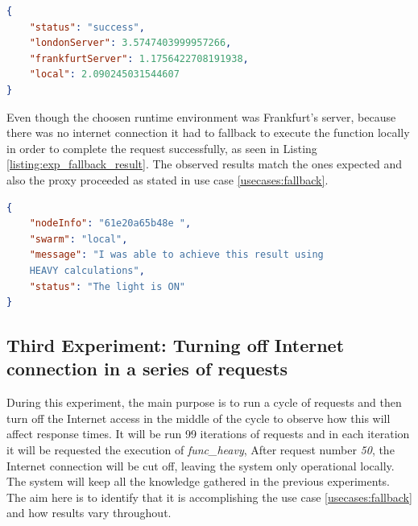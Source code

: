 \documentclass[conference]{IEEEtran}
\begin{document}
\begin{listing}
\begin{lstlisting}[language=json, basicstyle=\footnotesize]
{
    "status": "success",
    "londonServer": 3.5747403999957266,
    "frankfurtServer": 1.1756422708191938,
    "local": 2.090245031544607
}

\end{lstlisting}
\caption{}
\label{listing:exp_weight_query}
\end{listing}

Even though the choosen runtime environment was Frankfurt's server, because there
was no internet connection it had to fallback to execute the function locally in
order to complete the request successfully, as seen in Listing
\ref{listing:exp_fallback_result}. The observed results match the ones expected
and also the proxy proceeded as stated in use case \ref{usecases:fallback}.

\begin{listing}
\begin{lstlisting}[language=json, basicstyle=\footnotesize]
{
    "nodeInfo": "61e20a65b48e ",
    "swarm": "local",
    "message": "I was able to achieve this result using
    HEAVY calculations",
    "status": "The light is ON"
}
\end{lstlisting}
\caption{The request was executed locally, as indicated by the key \textit{swarm},
which is the swarm (runtime environment) where the function was executed.
\textit{local}, is the name given to the local network of devices, as configured
when setting up the proxy.}
\label{listing:exp_fallback_result}
\end{listing}


\subsection{Third Experiment: Turning off Internet connection in a series of requests}
During this experiment, the main purpose is to run a cycle of requests and then
turn off the Internet access in the middle of the cycle to observe how this will
affect response times. It will be run 99 iterations of requests and in each
iteration it will be requested the execution of \textit{func\_heavy}, After
request number \textit{50}, the Internet connection will be cut off, leaving the
system only operational locally. The system will keep all the knowledge gathered
in the previous experiments. The aim here is to identify that it is accomplishing
the use case \ref{usecases:fallback} and how results vary throughout.
\end{document}
